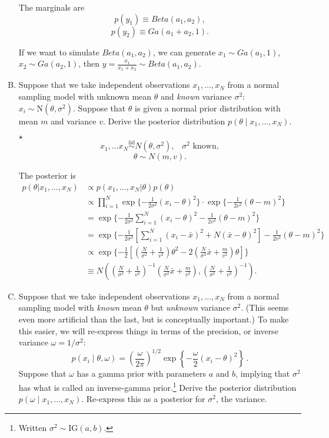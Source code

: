 \documentclass[11pt]{article}
\newcommand{\jie}{$\star$ }
\newcommand{\iid}{\overset{\text{iid}}{\sim}}
\begin{document}
\begin{enumerate}[(A)]
The marginals are
$$p(y_1) \equiv Beta(a_1,a_2),$$
$$p(y_2) \equiv Ga(a_1+a_2,1).$$

If we want to simulate $Beta(a_1,a_2)$, we can generate $x_1 \sim Ga(a_1,1)$, $x_2 \sim Ga(a_2,1)$, then $y = \frac{x_1}{x_1+x_2} \sim Beta(a_1,a_2)$.

\bigskip

\item Suppose that we take independent observations $x_1, \ldots, x_N$ from a normal sampling model with unknown mean $\theta$ and \textit{known} variance $\sigma^2$: $x_i \sim \mbox{N}(\theta, \sigma^2)$.  Suppose that $\theta$ is given a normal prior distribution with mean $m$ and variance $v$.  Derive the posterior distribution $p(\theta \mid x_1, \ldots, x_N)$.

\bigskip

\jie 
$$x_1, \dots x_N \iid N(\theta,\sigma^2), \;\;\; \sigma^2 \text{ known},$$
$$\theta \sim N(m,v).$$

The posterior is
\begin{align*}
    p(\theta|x_1,\dots,x_N) &\propto p(x_1,\dots,x_N |\theta) p(\theta) \\
    &\propto \prod_{i=1}^N \exp \{-\frac{1}{2\sigma^2} (x_i-\theta)^2\} \cdot \exp \{-\frac{1}{2v^2} (\theta-m)^2\} \\
    &= \exp \{-\frac{1}{2\sigma^2} \sum_{i=1}^N (x_i-\theta)^2 - \frac{1}{2v^2}(\theta-m)^2 \} \\
    &= \exp \{-\frac{1}{2\sigma^2} [\sum_{i=1}^N (x_i-\bar{x})^2 + N(\bar{x}-\theta)^2] - \frac{1}{2v^2}(\theta-m)^2 \} \\
    &\propto \exp \{ -\frac{1}{2} [(\frac{N}{\sigma^2}+\frac{1}{v^2}) \theta^2 - 2(\frac{N}{\sigma^2} \bar{x} + \frac{m}{v^2}) \theta] \} \\
    &\equiv N( (\frac{N}{\sigma^2}+\frac{1}{v^2})^{-1}(\frac{N}{\sigma^2} \bar{x} + \frac{m}{v^2}), (\frac{N}{\sigma^2}+\frac{1}{v^2})^{-1} ).
\end{align*}

\bigskip

\item Suppose that we take independent observations $x_1, \ldots, x_N$ from a normal sampling model with \textit{known} mean $\theta$ but \textit{unknown} variance $\sigma^2$.  (This seems even more artificial than the last, but is conceptually important.)  To make this easier, we will re-express things in terms of the precision, or inverse variance $\omega = 1/\sigma^2$:
$$
p(x_i \mid \theta, \omega) = \left( \frac{\omega}{2 \pi} \right)^{1/2} \exp \left\{ -\frac{\omega}{2} (x_i - \theta)^2 \right\} \, .
$$
Suppose that $\omega$ has a gamma prior with parameters $a$ and $b$, implying that $\sigma^2$ has what is called an inverse-gamma prior.\footnote{Written $\sigma^2 \sim \mbox{IG}(a,b)$.}  Derive the posterior distribution $p(\omega \mid x_1, \ldots, x_N)$.  Re-express this as a posterior for $\sigma^2$, the variance.


\end{enumerate}
\end{document}
